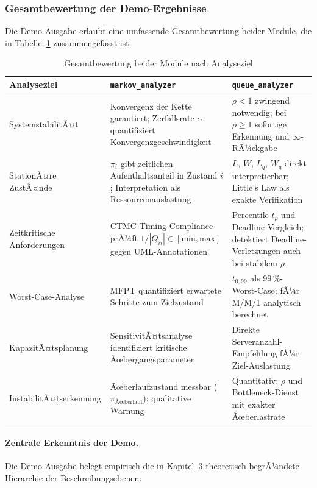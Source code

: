 ﻿\documentclass[a4paper,12pt]{scrreprt}
\theoremstyle{definition}
\begin{document}
\subsubsection{Gesamtbewertung der Demo-Ergebnisse}

Die Demo-Ausgabe erlaubt eine umfassende Gesamtbewertung beider Module,
die in Tabelle~\ref{tab:gesamtbewertung} zusammengefasst ist.

\begin{table}[H]
	\centering
	\begin{tabular}{@{}p{4cm}p{5cm}p{5cm}@{}}
		\toprule
		\textbf{Analyseziel} & \textbf{\texttt{markov\_analyzer}} &
		\textbf{\texttt{queue\_analyzer}} \\
		\midrule
		SystemstabilitÃ¤t & Konvergenz der Kette garantiert;
		Zerfallsrate $\alpha$ quantifiziert Konvergenzgeschwindigkeit &
		$\rho < 1$ zwingend notwendig; bei $\rho \geq 1$ sofortige
		Erkennung und $\infty$-RÃ¼ckgabe \\
		\addlinespace
		StationÃ¤re ZustÃ¤nde & $\pi_i$ gibt zeitlichen Aufenthaltsanteil
		in Zustand $i$; Interpretation als Ressourcenauslastung &
		$L$, $W$, $L_q$, $W_q$ direkt interpretierbar;
		Little's Law als exakte Verifikation \\
		\addlinespace
		Zeitkritische Anforderungen & CTMC-Timing-Compliance prÃ¼ft
		$1/|Q_{ii}| \in [\text{min}, \text{max}]$ gegen UML-Annotationen &
		Percentile $t_p$ und Deadline-Vergleich; detektiert
		Deadline-Verletzungen auch bei stabilem $\rho$ \\
		\addlinespace
		Worst-Case-Analyse & MFPT quantifiziert erwartete Schritte
		zum Zielzustand & $t_{0{,}99}$ als 99\,\%-Worst-Case;
		fÃ¼r M/M/1 analytisch berechnet \\
		\addlinespace
		KapazitÃ¤tsplanung & SensitivitÃ¤tsanalyse identifiziert kritische
		Ãœbergangsparameter & Direkte Serveranzahl-Empfehlung
		fÃ¼r Ziel-Auslastung \\
		\addlinespace
		InstabilitÃ¤tserkennung & Ãœberlaufzustand messbar ($\pi_\text{Ãœberlauf}$);
		qualitative Warnung & Quantitativ: $\rho$ und Bottleneck-Dienst
		mit exakter Ãœberlastrate \\
		\bottomrule
	\end{tabular}
	\caption{Gesamtbewertung beider Module nach Analyseziel}
	\label{tab:gesamtbewertung}
\end{table}

\paragraph{Zentrale Erkenntnis der Demo.}
Die Demo-Ausgabe belegt empirisch die in Kapitel~3 theoretisch begrÃ¼ndete
Hierarchie der Beschreibungsebenen:
\end{document}
